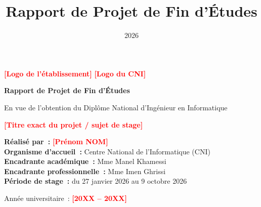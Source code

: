 \documentclass[12pt,a4paper,oneside]{report}
\title{Rapport de Projet de Fin d'Études}
\author{\todo{Prénom NOM}}
\date{2026}
\newcommand{\todo}[1]{\textcolor{red}{\textbf{[#1]}}}
\begin{document}
\begin{titlepage}
    \centering
    \vspace*{1cm}
    \todo{Logo de l'établissement} \hfill \todo{Logo du CNI}

    \vspace{2cm}
    {\LARGE \bfseries Rapport de Projet de Fin d'Études\par}
    \vspace{0.5cm}
    {\large En vue de l'obtention du Diplôme National d'Ingénieur en Informatique\par}

    \vspace{2cm}
    {\Large \todo{Titre exact du projet / sujet de stage}\par}

    \vspace{2cm}
    \begin{flushleft}
        \textbf{Réalisé par~:} \todo{Prénom NOM} \\[0.3cm]
        \textbf{Organisme d'accueil~:} Centre National de l'Informatique (CNI) \\[0.3cm]
        \textbf{Encadrante académique~:} Mme Manel Khamessi \\[0.3cm]
        \textbf{Encadrante professionnelle~:} Mme Imen Ghrissi \\[0.3cm]
        \textbf{Période de stage~:} du 27 janvier 2026 au 9 octobre 2026
    \end{flushleft}

    \vfill
    {\large Année universitaire~: \todo{20XX -- 20XX}\par}
\end{titlepage}

\tableofcontents
\clearpage


\end{document}
